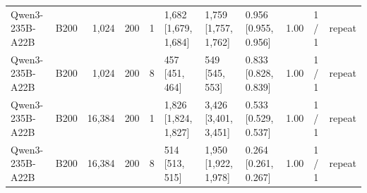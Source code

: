 \begin{landscape}
\begin{longtable}{llrrrlllrll}
Qwen3-235B-A22B & B200 & 1,024 & 200 & 1 & 1,682 {[}1,679, 1,684{]} & 1,759 {[}1,757, 1,762{]} & 0.956 {[}0.955, 0.956{]} & 1.00 & 1 / 1 & repeat \\
Qwen3-235B-A22B & B200 & 1,024 & 200 & 8 & 457 {[}451, 464{]} & 549 {[}545, 553{]} & 0.833 {[}0.828, 0.839{]} & 1.00 & 1 / 1 & repeat \\
Qwen3-235B-A22B & B200 & 16,384 & 200 & 1 & 1,826 {[}1,824, 1,827{]} & 3,426 {[}3,401, 3,451{]} & 0.533 {[}0.529, 0.537{]} & 1.00 & 1 / 1 & repeat \\
Qwen3-235B-A22B & B200 & 16,384 & 200 & 8 & 514 {[}513, 515{]} & 1,950 {[}1,922, 1,978{]} & 0.264 {[}0.261, 0.267{]} & 1.00 & 1 / 1 & repeat \\
\end{longtable}
\endgroup
\end{landscape}
\restoregeometry
